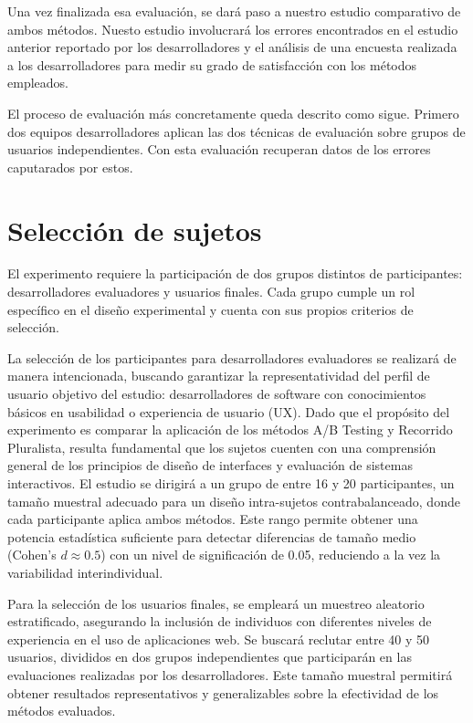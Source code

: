 \documentclass[a4paper,12pt]{report}
\begin{document}
Una vez finalizada esa evaluación, se dará paso a nuestro estudio comparativo de ambos métodos. Nuesto estudio involucrará los errores encontrados en el estudio anterior reportado por los desarrolladores y el análisis de una encuesta realizada a los desarrolladores para medir su grado de satisfacción con los métodos empleados.

El proceso de evaluación más concretamente queda descrito como sigue. Primero dos equipos desarrolladores aplican las dos técnicas de evaluación sobre grupos de usuarios independientes. Con esta evaluación recuperan datos de los errores caputarados por estos. 


\section{Selección de sujetos}
El experimento requiere la participación de dos grupos distintos de participantes: desarrolladores evaluadores y usuarios finales. Cada grupo cumple un rol específico en el diseño experimental y cuenta con sus propios criterios de selección.

La selección de los participantes para desarrolladores evaluadores se realizará de manera intencionada, buscando garantizar la representatividad del perfil de usuario objetivo del estudio: desarrolladores de software con conocimientos básicos en usabilidad o experiencia de usuario (UX). Dado que el propósito del experimento es comparar la aplicación de los métodos A/B Testing y Recorrido Pluralista, resulta fundamental que los sujetos cuenten con una comprensión general de los principios de diseño de interfaces y evaluación de sistemas interactivos.
El estudio se dirigirá a un grupo de entre 16 y 20 participantes, un tamaño muestral adecuado para un diseño intra-sujetos contrabalanceado, donde cada participante aplica ambos métodos. Este rango permite obtener una potencia estadística suficiente para detectar diferencias de tamaño medio (Cohen's $d \approx 0.5$) con un nivel de significación de 0.05, reduciendo a la vez la variabilidad interindividual.

Para la selección de los usuarios finales, se empleará un muestreo aleatorio estratificado, asegurando la inclusión de individuos con diferentes niveles de experiencia en el uso de aplicaciones web. Se buscará reclutar entre 40 y 50 usuarios, divididos en dos grupos independientes que participarán en las evaluaciones realizadas por los desarrolladores. Este tamaño muestral permitirá obtener resultados representativos y generalizables sobre la efectividad de los métodos evaluados.
\end{document}
